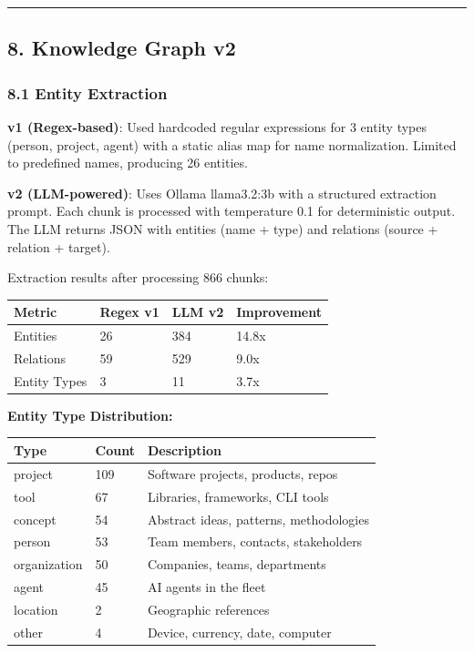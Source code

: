 \documentclass[
]{article}
\newcounter{none} %
\begin{document}
\begin{center}\rule{0.5\linewidth}{0.5pt}\end{center}

\subsection{8. Knowledge Graph v2}\label{knowledge-graph-v2}

\subsubsection{8.1 Entity Extraction}\label{entity-extraction}

\textbf{v1 (Regex-based)}: Used hardcoded regular expressions for 3
entity types (person, project, agent) with a static alias map for name
normalization. Limited to predefined names, producing 26 entities.

\textbf{v2 (LLM-powered)}: Uses Ollama llama3.2:3b with a structured
extraction prompt. Each chunk is processed with temperature 0.1 for
deterministic output. The LLM returns JSON with entities (name + type)
and relations (source + relation + target).

Extraction results after processing 866 chunks:

{\def\LTcaptype{none} %
\begin{longtable}[]{@{}llll@{}}
\toprule\noalign{}
Metric & Regex v1 & LLM v2 & Improvement \\
\midrule\noalign{}
\endhead
\bottomrule\noalign{}
\endlastfoot
Entities & 26 & 384 & 14.8x \\
Relations & 59 & 529 & 9.0x \\
Entity Types & 3 & 11 & 3.7x \\
\end{longtable}
}

\textbf{Entity Type Distribution:}

{\def\LTcaptype{none} %
\begin{longtable}[]{@{}lll@{}}
\toprule\noalign{}
Type & Count & Description \\
\midrule\noalign{}
\endhead
\bottomrule\noalign{}
\endlastfoot
project & 109 & Software projects, products, repos \\
tool & 67 & Libraries, frameworks, CLI tools \\
concept & 54 & Abstract ideas, patterns, methodologies \\
person & 53 & Team members, contacts, stakeholders \\
organization & 50 & Companies, teams, departments \\
agent & 45 & AI agents in the fleet \\
location & 2 & Geographic references \\
other & 4 & Device, currency, date, computer \\
\end{longtable}
}
\end{document}
